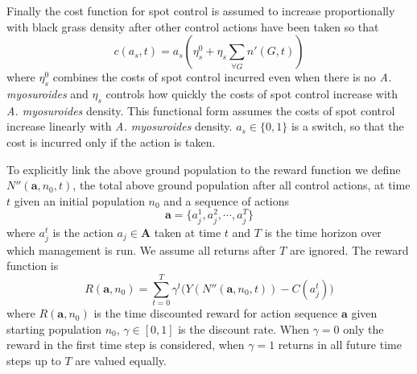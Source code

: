 \documentclass[12pt, a4paper]{article}
\begin{document}
Finally the cost function for spot control is assumed to increase proportionally with black grass density after other control actions have been taken so that
\begin{equation}
	c(a_s, t) = a_s\left(\eta_s^0 + \eta_s \sum_{\forall G} n'(G, t)\right)
\end{equation}  
where $\eta_s^0$ combines the costs of spot control incurred even when there is no \textit{A. myosuroides} and $\eta_s$ controls how quickly the costs of spot control increase with \textit{A. myosuroides} density. This functional form assumes the costs of spot control increase linearly with \textit{A. myosuroides} density. $a_s \in \{0, 1\}$ is a switch, so that the cost is incurred only if the action is taken.       

To explicitly link the above ground population to the reward function we define $N''(\mathbf{a}, n_0, t)$, the total above ground population after all control actions, at time $t$ given an initial population $n_0$ and a sequence of actions 
\begin{equation}
	\mathbf{a} = \{a_j^1, a_j^2, \cdots, a_j^T\}
\end{equation}	   
where $a_j^t$ is the action $a_j \in \mathbf{A}$ taken at time $t$ and $T$ is the time horizon over which management is run. We assume all returns after $T$ are ignored. The reward function is  
\begin{equation}
	R(\mathbf{a}, n_0) = \sum_{t=0}^T \gamma^t \Big( Y(N''(\mathbf{a}, n_0, t)) - C(a_j^t) \Big)
\end{equation}
where $R(\mathbf{a}, n_0)$ is the time discounted reward for action sequence $\mathbf{a}$ given starting population $n_0$, $\gamma \in [0, 1]$ is the discount rate. When $\gamma = 0$ only the reward in the first time step is considered, when $\gamma = 1$ returns in all future time steps up to $T$ are valued equally.
\end{document}

